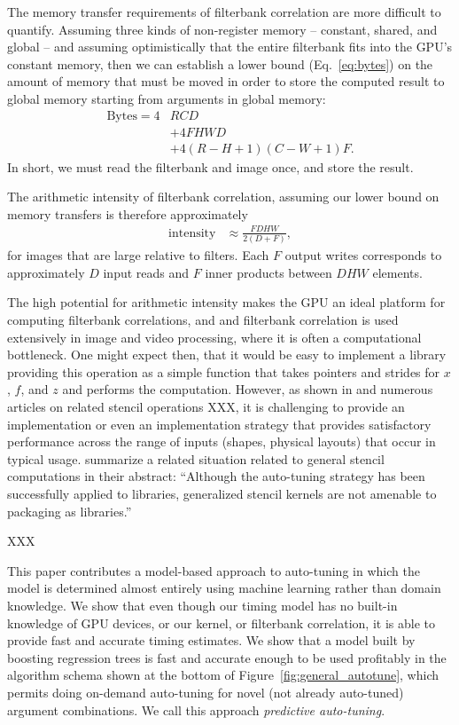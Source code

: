 \documentclass{sig-alternate}
\begin{document}
The memory transfer requirements of filterbank correlation are more difficult to quantify.
Assuming three kinds of non-register memory -- constant, shared, and global --
and assuming optimistically that the entire filterbank fits into the GPU's constant memory,
then we can establish a lower bound (Eq.~\ref{eq:bytes}) on the amount of
memory that must be moved in order to store the computed result to global
memory starting from arguments in global memory:
\begin{align}
\mathrm{Bytes} = 4&RCD \nonumber \\
& + 4FHWD \nonumber \\
& + 4(R-H+1)(C-W+1)F.
\label{eq:bytes}
\end{align}
In short, we must read the filterbank and image once, and store the result.

The arithmetic intensity of filterbank correlation, assuming our lower bound on memory transfers
is therefore approximately
\begin{align}
\mathrm{intensity} & \approx \frac {FDHW} {2(D+F)},
\end{align}
for images that are large relative to filters.
Each $F$ output writes corresponds to approximately $D$ input reads
and $F$ inner products between $DHW$ elements.

The high potential for arithmetic intensity makes the GPU an ideal platform for computing filterbank correlations,
and and filterbank correlation is used extensively in image and video processing,
where it is often a computational bottleneck.
One might expect then, that it would be easy to implement a library providing
this operation as a simple function that takes pointers and strides for $x$, $f$, and $z$ and performs the computation.
However, as shown in \citet{pinto+cox:2011gcg} and numerous articles on
related stencil operations XXX, it is challenging to provide an implementation
or even an implementation strategy that provides satisfactory performance
across the range of inputs (shapes, physical layouts) that occur in
typical usage.
\citet{kamil+etal:2009} summarize a related situation related to general stencil computations in their abstract:
``Although the auto-tuning strategy has been successfully applied to libraries,
generalized stencil kernels are not amenable to packaging as libraries.''

XXX \cite{datta:2009}

This paper contributes a model-based approach to auto-tuning in which the model
is determined almost entirely using machine learning rather than domain
knowledge.  We show that even though our timing model has no built-in knowledge of GPU
devices, or our kernel, or filterbank correlation, it is able to provide fast
and accurate timing estimates.
We show that a model built by boosting regression trees
is fast and accurate enough to be used profitably
in the algorithm schema shown at the bottom of
Figure~\ref{fig:general_autotune}, which permits doing on-demand auto-tuning
for novel (not already auto-tuned) argument combinations.
We call this approach {\em predictive auto-tuning}.
\end{document}
